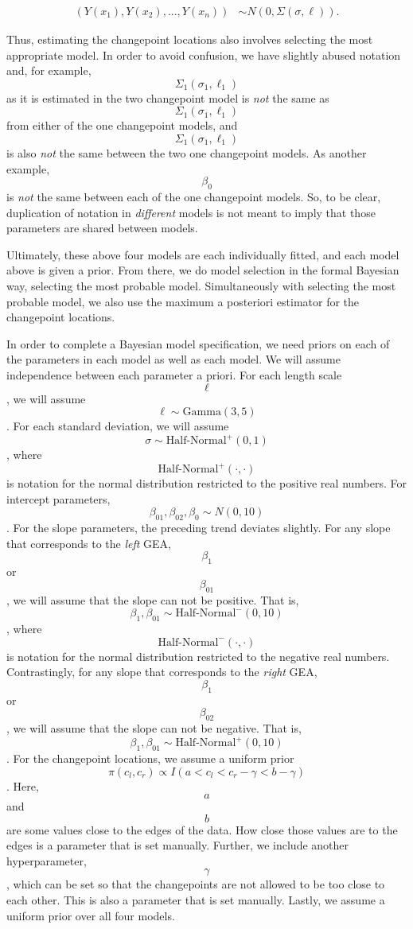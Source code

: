 \documentclass[12pt]{article}
\begin{document}
\begin{align}
(Y(x_{1}), Y(x_{2}), ..., Y(x_{n})) &\sim N(0, \Sigma(\sigma, \ell)).
\end{align}

Thus, estimating the changepoint locations also involves selecting the
most appropriate model. In order to avoid confusion, we have slightly
abused notation and, for example, \[\Sigma_1(\sigma_1, \ell_1)\] as it
is estimated in the two changepoint model is \emph{not} the same as
\[\Sigma_1(\sigma_1, \ell_1)\] from either of the one changepoint
models, and \[\Sigma_1(\sigma_1, \ell_1)\] is also \emph{not} the same
between the two one changepoint models. As another example, \[\beta_0\]
is \emph{not} the same between each of the one changepoint models. So,
to be clear, duplication of notation in \emph{different} models is not
meant to imply that those parameters are shared between models.

Ultimately, these above four models are each individually fitted, and
each model above is given a prior. From there, we do model selection in
the formal Bayesian way, selecting the most probable model.
Simultaneously with selecting the most probable model, we also use the
maximum a posteriori estimator for the changepoint locations.

In order to complete a Bayesian model specification, we need priors on
each of the parameters in each model as well as each model. We will
assume independence between each parameter a priori. For each length
scale \[\ell\], we will assume \[\ell \sim \text{Gamma}(3,5)\]. For each
standard deviation, we will assume
\[\sigma \sim \text{Half-Normal}^{+}(0,1)\], where
\[\text{Half-Normal}^{+}(\cdot,\cdot)\] is notation for the normal
distribution restricted to the positive real numbers. For intercept
parameters, \[\beta_{01}, \beta_{02}, \beta_0 \sim N(0, 10)\]. For the
slope parameters, the preceding trend deviates slightly. For any slope
that corresponds to the \emph{left} GEA, \[\beta_1\] or \[\beta_{01}\],
we will assume that the slope can not be positive. That is,
\[\beta_1, \beta_{01} \sim \text{Half-Normal}^{-}(0,10)\], where
\[\text{Half-Normal}^{-}(\cdot, \cdot)\] is notation for the normal
distribution restricted to the negative real numbers. Contrastingly, for
any slope that corresponds to the \emph{right} GEA, \[\beta_1\] or
\[\beta_{02}\], we will assume that the slope can not be negative. That
is, \[\beta_1, \beta_{01} \sim \text{Half-Normal}^{+}(0,10)\]. For the
changepoint locations, we assume a uniform prior
\[\pi(c_l, c_r) \propto I(a < c_l < c_r - \gamma < b - \gamma)\]. Here,
\[a\] and \[b\] are some values close to the edges of the data. How
close those values are to the edges is a parameter that is set manually.
Further, we include another hyperparameter, \[\gamma\], which can be set
so that the changepoints are not allowed to be too close to each other.
This is also a parameter that is set manually. Lastly, we assume a
uniform prior over all four models.
\end{document}
